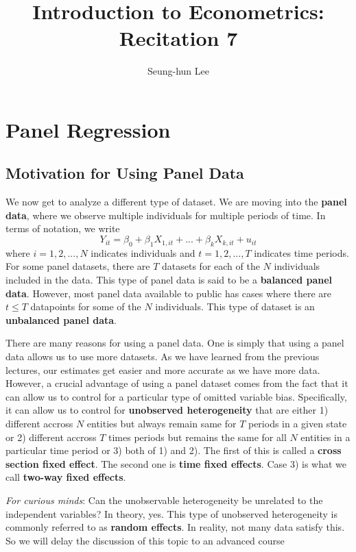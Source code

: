 \documentclass[12pt]{article}
\title{Introduction to Econometrics: Recitation 7}
\theoremstyle{definition}
\theoremstyle{property}
\theoremstyle{assumption}
\theoremstyle{example}
\theoremstyle{comment}
\begin{document}
\linespread{1.25}
\author{Seung-hun Lee}
\date{}
\maketitle
\section{Panel Regression}
\subsection{Motivation for Using Panel Data}
We now get to analyze a different type of dataset. We are moving into the \textbf{panel data}, where we observe multiple individuals for multiple periods of time. In terms of notation, we write
\[
Y_{it} = \beta_0 + \beta_1X_{1,it}+ ... +\beta_kX_{k,it}+u_{it}
\]
where $i=1,2,...,N$ indicates individuals and $t=1,2,...,T$ indicates time periods. For some panel datasets, there are $T$ datasets for each of the $N$ individuals included in the data. This type of panel data is said to be a \textbf{balanced panel data}. However, most panel data available to public has cases where there are $t\leq T$ datapoints for some of the $N$ individuals. This type of dataset is an \textbf{unbalanced panel data}. \par\medskip
There are many reasons for using a panel data. One is simply that using a panel data allows us to use more datasets. As we have learned from the previous lectures, our estimates get easier and more accurate as we have more data. However, a crucial advantage of using a panel dataset comes from the fact that it can allow us to control for a particular type of omitted variable bias. Specifically, it can allow us to control for \textbf{unobserved heterogeneity} that are either 1) different accross $N$ entities but always remain same for $T$ periods in a given state or 2) different accross $T$ times periods but remains the same for all $N$ entities in a particular time period or 3) both of 1) and 2). The first of this is called a \textbf{cross section fixed effect}. The second one is \textbf{time fixed effects}. Case 3) is what we call \textbf{two-way fixed effects}.\par\medskip
\begin{mdframed}[backgroundcolor =blue!10]
\textit{For curious minds}: Can the unobservable heterogeneity be unrelated to the independent variables? In theory, yes. This type of unobserved heterogeneity is commonly referred to as \textbf{random effects}. In reality, not many data satisfy this. So we will delay the discussion of this topic to an advanced course 
\end{mdframed} \par\medskip
\end{document}
